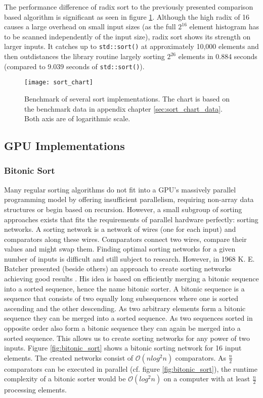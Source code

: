 The performance difference of radix sort to the previously presented comparison based algorithm is significant as seen in figure \ref{fig:sort_chart}. Although the high radix of 16 causes a large overhead on small input sizes (as the full $2^{16}$ element histogram has to be scanned independently of the input size), radix sort shows its strength on larger inputs. It catches up to \lstinline!std::sort()! at approximately 10,000 elements and then outdistances the library routine largely sorting $2^{26}$ elements in 0.884 seconds (compared to 9.039 seconds of \lstinline!std::sort()!).

\begin{figure}
\centering
\texttt{[image: sort\_chart]}
\caption{Benchmark of several sort implementations. The chart is based on the benchmark data in appendix chapter \ref{sec:sort_chart_data}. Both axis are of logarithmic scale.}
\label{fig:sort_chart}
\end{figure}

\subsection{GPU Implementations}

\subsubsection{Bitonic Sort}

Many regular sorting algorithms do not fit into a GPU's massively parallel programming model by offering insufficient parallelism, requiring non-array data structures or begin based on recursion. However, a small subgroup of sorting approaches exists that fits the requirements of parallel hardware perfectly: sorting networks. A sorting network is a network of wires (one for each input) and comparators along these wires. Comparators connect two wires, compare their values and might swap them.
Finding optimal sorting networks for a given number of inputs is difficult and still subject to research. However, in 1968 K. E. Batcher presented (beside others) an approach to create sorting networks achieving good results \cite{sort_bitonic}. His idea is based on efficiently merging a bitonic sequence into a sorted sequence, hence the name bitonic sorter. A bitonic sequence is a sequence that consists of two equally long subsequences where one is sorted ascending and the other descending. As two arbitrary elements form a bitonic sequence they can be merged into a sorted sequence. As two sequences sorted in opposite order also form a bitonic sequence they can again be merged into a sorted sequence. This allows us to create sorting networks for any power of two inputs. Figure \ref{fig:bitonic_sort} shows a bitonic sorting network for 16 input elements. The created networks consist of $\mathcal{O}(n  log^2 n)$ comparators. As $\frac{n}{2}$ comparators can be executed in parallel (cf. figure \ref{fig:bitonic_sort}), the runtime complexity of a bitonic sorter would be $\mathcal{O}(log^2 n)$ on a computer with at least $\frac{n}{2}$ processing elements.

